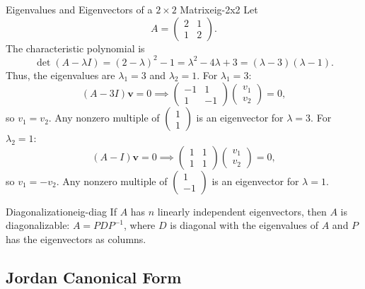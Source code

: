 \begin{example}{Eigenvalues and Eigenvectors of a \(2\times2\) Matrix}{eig-2x2}
    Let
    \[
        A = \begin{pmatrix}
            2 & 1 \\
            1 & 2
        \end{pmatrix}.
    \]
    The characteristic polynomial is
    \[
        \det(A - \lambda I) = (2-\lambda)^2 - 1 = \lambda^2 - 4\lambda + 3 = (\lambda-3)(\lambda-1).
    \]
    Thus, the eigenvalues are \(\lambda_1 = 3\) and \(\lambda_2 = 1\).
    For \(\lambda_1 = 3\):
    \[
        (A - 3I)\mathbf{v} = 0 \implies
        \begin{pmatrix}
            -1 & 1  \\
            1  & -1
        \end{pmatrix}
        \begin{pmatrix}
            v_1 \\ v_2
        \end{pmatrix}
        = 0,
    \]
    so \(v_1 = v_2\). Any nonzero multiple of \(\begin{pmatrix}1\\1\end{pmatrix}\) is an eigenvector for \(\lambda=3\).
    For \(\lambda_2 = 1\):
    \[
        (A - I)\mathbf{v} = 0 \implies
        \begin{pmatrix}
            1 & 1 \\
            1 & 1
        \end{pmatrix}
        \begin{pmatrix}
            v_1 \\ v_2
        \end{pmatrix}
        = 0,
    \]
    so \(v_1 = -v_2\). Any nonzero multiple of \(\begin{pmatrix}1\\-1\end{pmatrix}\) is an eigenvector for \(\lambda=1\).
\end{example}

\begin{remark}{Diagonalization}{eig-diag}
    If \(A\) has \(n\) linearly independent eigenvectors, then \(A\) is diagonalizable: \(A = PDP^{-1}\), where \(D\) is diagonal with the eigenvalues of \(A\) and \(P\) has the eigenvectors as columns.
\end{remark}

\subsection{Jordan Canonical Form}

